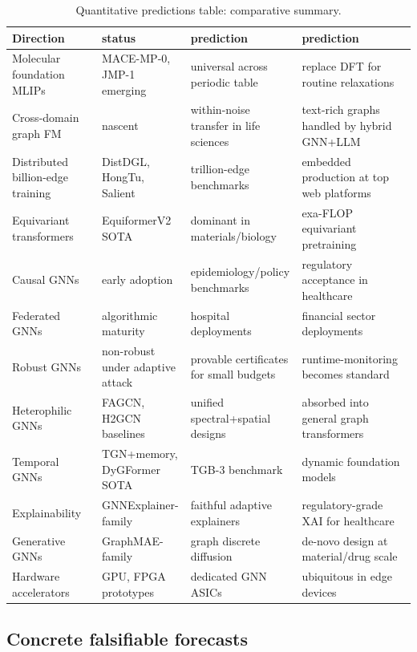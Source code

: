 \documentclass{article}
\begin{document}
\begin{table}[t]
\centering
\caption{Quantitative predictions table: comparative summary.}
\label{tab:quantitative-predictions-table}
\begin{tabular}{>{\raggedright\arraybackslash}p{0.2260\linewidth}
  >{\raggedright\arraybackslash}p{0.2192\linewidth}
  >{\raggedright\arraybackslash}p{0.2671\linewidth}
  >{\raggedright\arraybackslash}p{0.2877\linewidth}}
\toprule
Direction & 2026 status & 2028 prediction & 2030 prediction \\
\midrule
Molecular foundation MLIPs & MACE-MP-0, JMP-1 emerging & universal across periodic table & replace DFT for routine relaxations \\
Cross-domain graph FM & nascent & within-noise transfer in life sciences & text-rich graphs handled by hybrid GNN+LLM \\
Distributed billion-edge training & DistDGL, HongTu, Salient & trillion-edge benchmarks & embedded production at top web platforms \\
Equivariant transformers & EquiformerV2 SOTA & dominant in materials/biology & exa-FLOP equivariant pretraining \\
Causal GNNs & early adoption & epidemiology/policy benchmarks & regulatory acceptance in healthcare \\
Federated GNNs & algorithmic maturity & hospital deployments & financial sector deployments \\
Robust GNNs & non-robust under adaptive attack & provable certificates for small budgets & runtime-monitoring becomes standard \\
Heterophilic GNNs & FAGCN, H2GCN baselines & unified spectral+spatial designs & absorbed into general graph transformers \\
Temporal GNNs & TGN+memory, DyGFormer SOTA & TGB-3 benchmark & dynamic foundation models \\
Explainability & GNNExplainer-family & faithful adaptive explainers & regulatory-grade XAI for healthcare \\
Generative GNNs & GraphMAE-family & graph discrete diffusion & de-novo design at material/drug scale \\
Hardware accelerators & GPU, FPGA prototypes & dedicated GNN ASICs & ubiquitous in edge devices \\
\end{tabular}
\end{table}

\subsection{Concrete falsifiable forecasts}\label{concrete-falsifiable-forecasts}
\end{document}
